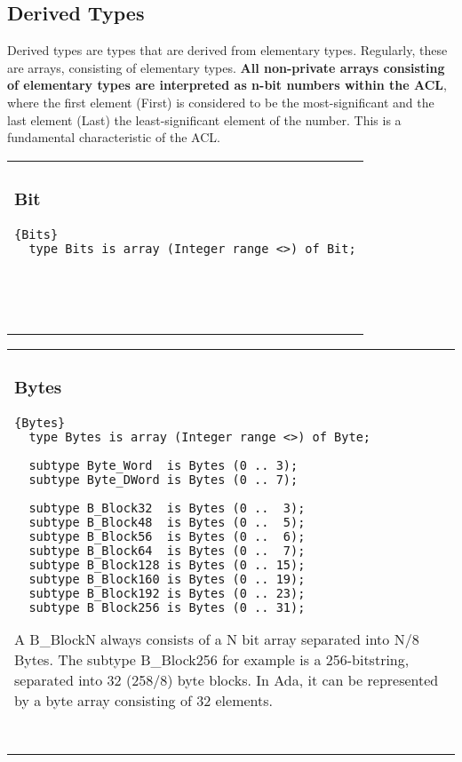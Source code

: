 

\subsection{Derived Types}
Derived types are types that are derived from elementary types. Regularly,
these are arrays, consisting of elementary types. \textbf{All non-private
arrays consisting of elementary types are interpreted as n-bit numbers within
the ACL}, where the first element (First) is considered to be the 
most-significant and the last element (Last) the least-significant element of 
the number. This is a fundamental characteristic of the ACL.

\begin{tabular}{p{\textwidth}}
\subsubsection{Bit}
\begin{lstlisting}{Bits}
  type Bits is array (Integer range <>) of Bit;
\end{lstlisting}\ \\ \ \\
\hline 
\end{tabular}


\begin{tabular}{p{\textwidth}}
\subsubsection{Bytes} 
\begin{lstlisting}{Bytes}
  type Bytes is array (Integer range <>) of Byte;
  
  subtype Byte_Word  is Bytes (0 .. 3);
  subtype Byte_DWord is Bytes (0 .. 7);

  subtype B_Block32  is Bytes (0 ..  3);
  subtype B_Block48  is Bytes (0 ..  5);
  subtype B_Block56  is Bytes (0 ..  6);
  subtype B_Block64  is Bytes (0 ..  7);
  subtype B_Block128 is Bytes (0 .. 15);
  subtype B_Block160 is Bytes (0 .. 19); 
  subtype B_Block192 is Bytes (0 .. 23);
  subtype B_Block256 is Bytes (0 .. 31);
\end{lstlisting}
A B\_BlockN always consists of a N bit array separated into N/8 Bytes.
The subtype B\_Block256 for example is a 256-bitstring, separated into
32 (258/8) byte blocks. In Ada, it can be represented by a byte array
consisting of 32 elements. \\ \ \\
\hline
\end{tabular}

